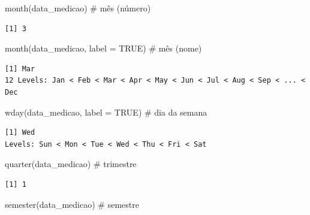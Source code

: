 \documentclass[
  letterpaper,
]{scrbook}
\newenvironment{Shaded}{\begin{snugshade}}{\end{snugshade}}
\newcommand{\AttributeTok}[1]{\textcolor[rgb]{0.40,0.45,0.13}{#1}}
\newcommand{\CommentTok}[1]{\textcolor[rgb]{0.37,0.37,0.37}{#1}}
\newcommand{\ConstantTok}[1]{\textcolor[rgb]{0.56,0.35,0.01}{#1}}
\newcommand{\FunctionTok}[1]{\textcolor[rgb]{0.28,0.35,0.67}{#1}}
\newcommand{\NormalTok}[1]{\textcolor[rgb]{0.00,0.23,0.31}{#1}}
\begin{document}
\begin{Shaded}
\begin{Highlighting}[]
\FunctionTok{month}\NormalTok{(data\_medicao)    }\CommentTok{\# mês (número)}
\end{Highlighting}
\end{Shaded}

\begin{verbatim}
[1] 3
\end{verbatim}

\begin{Shaded}
\begin{Highlighting}[]
\FunctionTok{month}\NormalTok{(data\_medicao, }\AttributeTok{label =} \ConstantTok{TRUE}\NormalTok{)  }\CommentTok{\# mês (nome)}
\end{Highlighting}
\end{Shaded}

\begin{verbatim}
[1] Mar
12 Levels: Jan < Feb < Mar < Apr < May < Jun < Jul < Aug < Sep < ... < Dec
\end{verbatim}

\begin{Shaded}
\begin{Highlighting}[]
\FunctionTok{wday}\NormalTok{(data\_medicao, }\AttributeTok{label =} \ConstantTok{TRUE}\NormalTok{)   }\CommentTok{\# dia da semana}
\end{Highlighting}
\end{Shaded}

\begin{verbatim}
[1] Wed
Levels: Sun < Mon < Tue < Wed < Thu < Fri < Sat
\end{verbatim}

\begin{Shaded}
\begin{Highlighting}[]
\FunctionTok{quarter}\NormalTok{(data\_medicao)  }\CommentTok{\# trimestre}
\end{Highlighting}
\end{Shaded}

\begin{verbatim}
[1] 1
\end{verbatim}

\begin{Shaded}
\begin{Highlighting}[]
\FunctionTok{semester}\NormalTok{(data\_medicao) }\CommentTok{\# semestre}
\end{Highlighting}
\end{Shaded}
\end{document}
